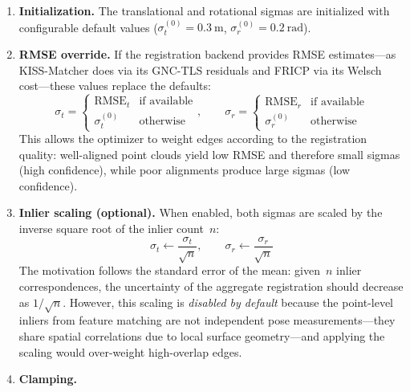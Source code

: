 \begin{enumerate}
    \item \textbf{Initialization.}
          The translational and rotational sigmas are initialized with
          configurable default values
          ($\sigma_t^{(0)} = \SI{0.3}{\metre}$,
           $\sigma_r^{(0)} = \SI{0.2}{\radian}$).
    \item \textbf{RMSE override.}
          If the registration backend provides RMSE estimates---as
          KISS-Matcher does via its GNC-TLS residuals and FRICP via its
          Welsch cost---these values replace the defaults:
          \begin{equation}
              \sigma_t = \begin{cases}
                  \mathrm{RMSE}_t & \text{if available} \\
                  \sigma_t^{(0)}  & \text{otherwise}
              \end{cases}, \qquad
              \sigma_r = \begin{cases}
                  \mathrm{RMSE}_r & \text{if available} \\
                  \sigma_r^{(0)}  & \text{otherwise}
              \end{cases}
          \end{equation}
          This allows the optimizer to weight edges according to the
          registration quality: well-aligned point clouds yield low RMSE
          and therefore small sigmas (high confidence), while poor
          alignments produce large sigmas (low confidence).
    \item \textbf{Inlier scaling (optional).}
          When enabled, both sigmas are scaled by the inverse square root
          of the inlier count~$n$:
          \begin{equation}
              \sigma_t \leftarrow \frac{\sigma_t}{\sqrt{n}}, \qquad
              \sigma_r \leftarrow \frac{\sigma_r}{\sqrt{n}}
          \end{equation}
          The motivation follows the standard error of the mean: given~$n$
          inlier correspondences, the uncertainty of the aggregate
          registration should decrease as $1/\sqrt{n}$.
          However, this scaling is \emph{disabled by default} because the
          point-level inliers from feature matching are not independent
          pose measurements---they share spatial correlations due to local
          surface geometry---and applying the scaling would
          over-weight high-overlap edges.
    \item \textbf{Clamping.}

\end{enumerate}
